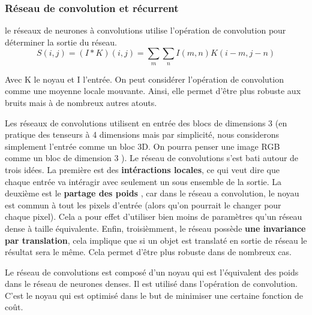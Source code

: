 \subsubsection{Réseau de convolution et récurrent}
le réseaux de neurones à convolutions utilise l'opération de convolution pour déterminer la sortie du réseau. 
$$S(i,j) = (I * K) (i, j) = \underset{m}{\sum} \underset{n}{\sum} I(m,n) K(i-m, j-n)$$

Avec K le noyau et I l'entrée. On peut considérer l'opération de convolution comme une moyenne locale mouvante. Ainsi, elle permet d'être plus robuste aux bruits mais à de nombreux autres atouts.


Les réseaux de convolutions utilisent en entrée des blocs de dimensions 3 (en pratique des tenseurs à 4 dimensions mais par simplicité, nous considerons simplement l'entrée comme un bloc 3D. On pourra penser une image RGB comme un bloc de dimension 3 ). Le réseau de convolutions s'est bati autour de trois idées. La première est des \textbf{intéractions locales}, ce qui veut dire que chaque entrée va intéragir avec seulement un sous ensemble de la sortie. La deuxième est le \textbf{partage des poids }, car dans le réseau a convolution, le noyau est commun à tout les pixels d'entrée (alors qu'on pourrait le changer pour chaque pixel). Cela a pour effet d'utiliser bien moins de paramètres qu'un réseau dense à taille équivalente. Enfin, troisièmment, le réseau possède \textbf{une invariance par translation}, cela implique que si un objet est translaté en sortie de réseau le résultat sera le même. Cela permet d'être plus robuste dans de nombreux cas.

Le réseau de convolutions est composé d'un noyau qui est l'équivalent des poids dans le réseau de neurones denses. Il est utilisé dans l'opération de convolution. C'est le noyau qui est optimisé dans le but de minimiser une certaine fonction de coût.

